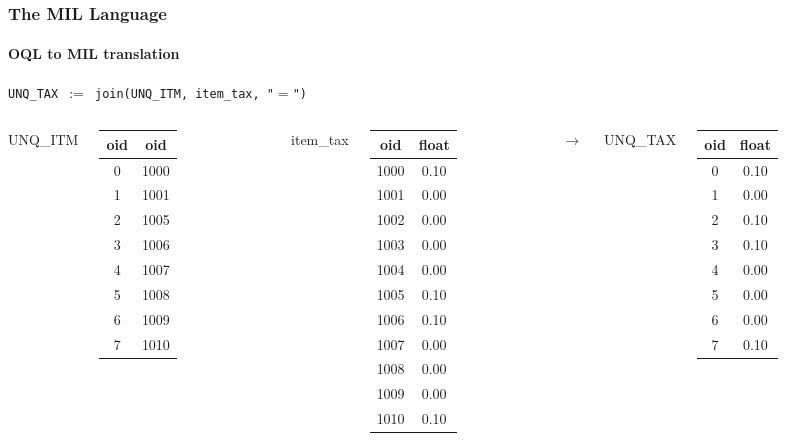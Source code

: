 \documentclass{beamer}
\begin{document}
\begin{frame}
  \frametitle{The MIL Language}
  \framesubtitle{OQL to MIL translation}

  \begin{block}{}
  {\tt UNQ\_TAX $:=$ join(UNQ\_ITM, item\_tax, "$=$")}
  \end{block}

  \begin{columns}

  \column{2cm}

  UNQ\_ITM
  \begin{tabular}{|c|c|}
    \hline
    oid & oid \\
    \hline
    0 & 1000 \\
    1 & 1001 \\
    2 & 1005 \\
    3 & 1006 \\
    4 & 1007 \\
    5 & 1008 \\
    6 & 1009 \\
    7 & 1010 \\
    \hline
  \end{tabular}

  \column{1.5cm}

  item\_tax
  \begin{tabular}{|c|c|}
    \hline
    oid & float \\
    \hline
    1000 & 0.10 \\
    1001 & 0.00 \\
    1002 & 0.00 \\
    1003 & 0.00 \\
    1004 & 0.00 \\
    1005 & 0.10 \\
    1006 & 0.10 \\
    1007 & 0.00 \\
    1008 & 0.00 \\
    1009 & 0.00 \\
    1010 & 0.10 \\
    \hline
  \end{tabular}

  \column{0.5cm}

  $\longrightarrow$

  \column{1cm}

  UNQ\_TAX
  \begin{tabular}{|c|c|}
    \hline
    oid & float \\
    \hline
    0 & 0.10 \\
    1 & 0.00 \\
    2 & 0.10 \\
    3 & 0.10 \\
    4 & 0.00 \\
    5 & 0.00 \\
    6 & 0.00 \\
    7 & 0.10 \\
    \hline
  \end{tabular}

  \end{columns}

\end{frame}
\end{document}

